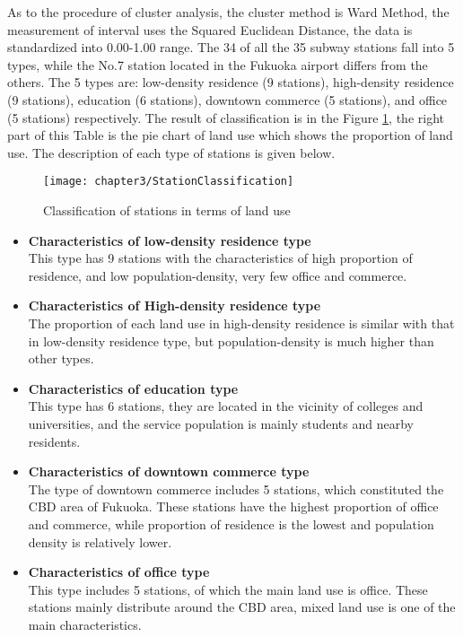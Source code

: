 %
As to the procedure of cluster analysis, the cluster method is Ward Method, the measurement of interval uses the Squared Euclidean Distance, the data is standardized into 0.00-1.00 range. The 34 of all the 35 subway stations fall into 5 types, while the No.7 station located in the Fukuoka airport differs from the others. The 5 types are: low-density residence (9 stations), high-density residence (9 stations), education (6 stations), downtown commerce (5 stations), and office (5 stations) respectively. The result of classification is in the Figure \ref{fig:chp3:StationClassification}, the right part of this Table is the pie chart of land use which shows the proportion of land use. The description of each type of stations is given below. 

%
\begin{figure}[htbp]
	\centering
	\texttt{[image: chapter3/StationClassification]}
	\caption{Classification of stations in terms of land use}
	\label{fig:chp3:StationClassification}
\end{figure}

%
\begin{itemize}
	\item \textbf{Characteristics of low-density residence type} \\
	This type has 9 stations with the characteristics of high proportion of residence, and low population-density, very few office and commerce.
	
	\item \textbf{Characteristics of High-density residence type} \\
	The proportion of each land use in high-density residence is similar with that in low-density residence type, but population-density is much higher than other types.
	
	\item \textbf{Characteristics of education type} \\
	This type has 6 stations, they are located in the vicinity of colleges and universities, and the service population is mainly students and nearby residents.
	
	\item \textbf{Characteristics of downtown commerce type} \\
	The type of downtown commerce includes 5 stations, which constituted the CBD area of Fukuoka. These stations have the highest proportion of office and commerce, while proportion of residence is the lowest and population density is relatively lower.
	
	\item \textbf{Characteristics of office type} \\
	This type includes 5 stations, of which the main land use is office. These stations mainly distribute around the CBD area, mixed land use is one of the main characteristics.
\end{itemize}


